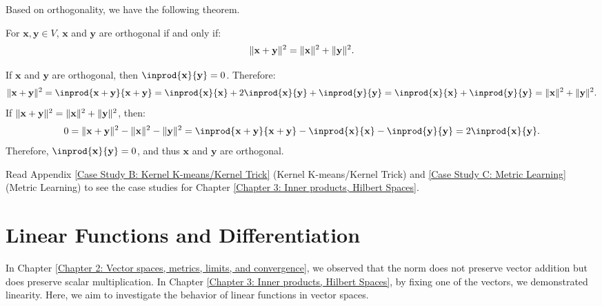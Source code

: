 \documentclass{huhtakm-template-book-v2}
\begin{document}
    Based on orthogonality, we have the following theorem.
    \begin{thm}
        For $\mathbf{x}, \mathbf{y} \in V$, $\mathbf{x}$ and $\mathbf{y}$ are orthogonal if and only if:
        \begin{equation*}
            \lVert{\mathbf{x} + \mathbf{y}}\rVert^{2} = \lVert{\mathbf{x}}\rVert^{2} + \lVert{\mathbf{y}}\rVert^{2}.
        \end{equation*}
    \end{thm}
    \begin{proofing}
        If $\mathbf{x}$ and $\mathbf{y}$ are orthogonal, then $\inprod{\mathbf{x}}{\mathbf{y}} = 0$. Therefore:
        \begin{equation*}
            \norm{\mathbf{x} + \mathbf{y}}^{2} = \inprod{\mathbf{x} + \mathbf{y}}{\mathbf{x} + \mathbf{y}} = \inprod{\mathbf{x}}{\mathbf{x}} + 2\inprod{\mathbf{x}}{\mathbf{y}} + \inprod{\mathbf{y}}{\mathbf{y}} = \inprod{\mathbf{x}}{\mathbf{x}} + \inprod{\mathbf{y}}{\mathbf{y}} = \norm{\mathbf{x}}^{2} + \norm{\mathbf{y}}^{2}.
        \end{equation*}
        If $\lVert{\mathbf{x} + \mathbf{y}}\rVert^{2} = \lVert{\mathbf{x}}\rVert^{2} + \lVert{\mathbf{y}}\rVert^{2}$, then:
        \begin{equation*}
            0 = \norm{\mathbf{x} + \mathbf{y}}^{2} - \norm{\mathbf{x}}^{2} - \norm{\mathbf{y}}^{2} = \inprod{\mathbf{x} + \mathbf{y}}{\mathbf{x} + \mathbf{y}} - \inprod{\mathbf{x}}{\mathbf{x}} - \inprod{\mathbf{y}}{\mathbf{y}} = 2\inprod{\mathbf{x}}{\mathbf{y}}.
        \end{equation*}
        Therefore, $\inprod{\mathbf{x}}{\mathbf{y}} = 0$, and thus $\mathbf{x}$ and $\mathbf{y}$ are orthogonal.
    \end{proofing}
    Read Appendix \ref{Case Study B: Kernel K-means/Kernel Trick} (Kernel K-means/Kernel Trick) and \ref{Case Study C: Metric Learning} (Metric Learning) to see the case studies for Chapter \ref{Chapter 3: Inner products, Hilbert Spaces}.
    
\chapter{Linear Functions and Differentiation}
    \label{Chapter 4: Linear Functions and Differentiation}
    In Chapter \ref{Chapter 2: Vector spaces, metrics, limits, and convergence}, we observed that the norm does not preserve vector addition but does preserve scalar multiplication. In Chapter \ref{Chapter 3: Inner products, Hilbert Spaces}, by fixing one of the vectors, we demonstrated linearity. Here, we aim to investigate the behavior of linear functions in vector spaces.
\end{document}
